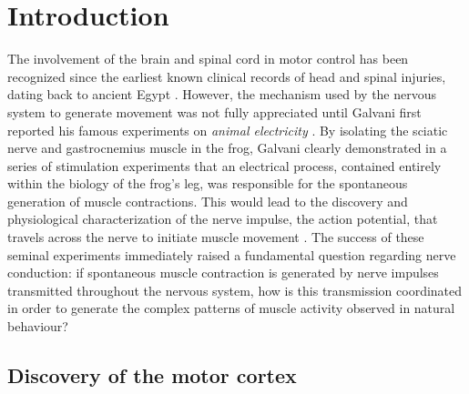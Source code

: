 \section{Introduction}

The involvement of the brain and spinal cord in motor control has been recognized since the earliest known clinical records of head and spinal injuries, dating back to ancient Egypt \citep{Louis1994,VanMiddendorp2010}. However, the mechanism used by the nervous system to generate movement was not fully appreciated until Galvani first reported his famous experiments on \textit{animal electricity} \citep{Galvani1791}. By isolating the sciatic nerve and gastrocnemius muscle in the frog, Galvani clearly demonstrated in a series of stimulation experiments that an electrical process, contained entirely within the biology of the frog's leg, was responsible for the spontaneous generation of muscle contractions. This would lead to the discovery and physiological characterization of the nerve impulse, the action potential, that travels across the nerve to initiate muscle movement \citep{DuBois-Reymond1843,Bernstein1868,Schuetze1983}. The success of these seminal experiments immediately raised a fundamental question regarding nerve conduction: if spontaneous muscle contraction is generated by nerve impulses transmitted throughout the nervous system, how is this transmission coordinated in order to generate the complex patterns of muscle activity observed in natural behaviour?

\subsection{Discovery of the motor cortex}

